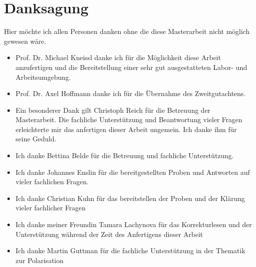 \thispagestyle{fancy}
\justifying
\chapter{Danksagung}

Hier möchte ich allen Personen danken ohne die diese Masterarbeit nicht möglich gewesen wäre.
\begin{itemize}
	\item Prof. Dr. Michael Kneissl danke ich für die Möglichkeit diese Arbeit anzufertigen und die Bereitstellung einer sehr gut ausgestatteten Labor- und Arbeitsumgebung.
	\item Prof. Dr. Axel Hoffmann danke ich für die Übernahme des Zweitgutachtens.
	\item Ein besonderer Dank gilt Christoph Reich für die Betreuung der Masterarbeit. Die fachliche Unterstützung und Beantwortung vieler Fragen erleichterte mir das anfertigen dieser Arbeit ungemein. Ich danke ihm für seine Geduld. 
	\item Ich danke Bettina Belde für die Betreuung und fachliche Unterstützung.
	\item Ich danke Johannes Enslin für die bereitgestellten Proben und Antworten auf vieler fachlichen Fragen.
	\item Ich danke Christian Kuhn für das bereitstellen der Proben und der Klärung vieler fachlicher Fragen
	\item Ich danke meiner Freundin Tamara Lachynova für das Korrekturlesen und der Unterstützung während der Zeit des Anfertigens dieser Arbeit
	\item Ich danke Martin Guttman für die fachliche Unterstützung in der Thematik zur Polarisation	
\end{itemize}